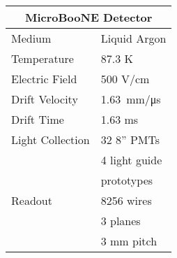 %
%
\color{magenta}\begin{tabular}{| l | l |}
	\hline
	\multicolumn{2}{|c|}{\normalsize\color{black}\textbf{MicroBooNE Detector}} \\ \hline \hline
\color{black}Medium & \color{black} Liquid Argon \\ \hline
\color{black}Temperature & \color{black} 87.3 K 		\\ \hline
\color{black}Electric Field & \color{black} 500 V/cm 	\\ \hline
\color{black}Drift Velocity & \color{black} \SI{1.63}{\milli\meter/\micro\second}  \\ \hline
\color{black}Drift Time  & \color{black}1.63 ms \\ \hline %
\color{black}Light Collection & \color{black}32 8'' PMTs \\
  & \color{black} 4 light guide\\ 
  & \color{black}prototypes \\ \hline
\color{black}Readout & \color{black}8256 wires \\
 & \color{black} 3 planes \\
  & \color{black} 3 mm pitch \\ 
 \hline

\end{tabular}

%
